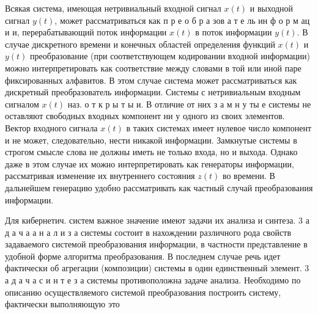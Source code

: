 \documentclass[10pt]{article}
\begin{document}
Всякая система, имеющая нетривиальный входной сигнал $x(t)$ и выходной сигнал $y(t)$, может рассматриваться как п р е о б р а зов а т е ль ин ф о р м ац и и, перерабатывающий поток информации $x(t)$ в поток информации $y(t)$. В случае дискретного времени и конечных областей определения функций $x(t)$ и $y(t)$ преобразование (при соответствующем кодировании входной информации) можно интерпретировать как соответствие между словами в той или иной паре фиксированных алфавитов. В этом случае система может рассматриваться как дискретный преобразователь информации. Системы с нетривиальным входным сигналом $x(t)$ наз. о т к р ы т ы и. В отличие от них з а м н у ты е системы не оставляют свободных входных компонент ни у одного из своих элементов. Вектор входного сигнала $x(t)$ в таких системах имеет нулевое число компонент и не может, следовательно, нести никакой информации. Замкнутые системы в строгом смысле слова не должны иметь не только входа, но и выхода. Однако даже в этом случае их можно интерпретировать как генераторы информации, рассматривая изменение их внутреннего состояния $z(t)$ во времени. В дальнейшем генерацию удобно рассматривать как частный случай преобразования информации.



Для кибернетич. систем важное значение имеют задачи их анализа и синтеза. 3 а д а ч а а н а л и з а системы состоит в нахождении различного рода свойств задаваемого системой преобразования информации, в частности представление в удобной форме алгоритма преобразования. В последнем случае речь идет фактически об агрегации (композиции) системы в один единственный элемент. 3 а д а ч а с и н т е з а системы противоположна задаче анализа. Необходимо по описанию осуществляемого системой преобразования построить систему, фактически выполняющую это
\end{document}
